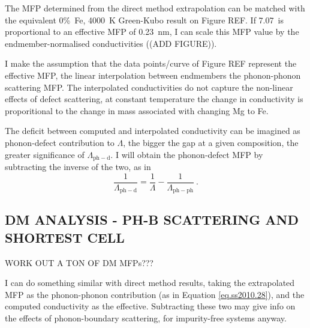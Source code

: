 The MFP determined from the direct method extrapolation can be matched with the equivalent 0\%~Fe, 4000~K Green-Kubo result on Figure REF. If 7.07~\wmks is proportional to an effective MFP of 0.23~nm, I can scale this MFP value by the \mgsios endmember-normalised conductivities ((ADD FIGURE)). 

I make the assumption that the data points/curve of Figure REF represent the effective MFP, the linear interpolation between endmembers the phonon-phonon scattering MFP. The interpolated conductivities do not capture the non-linear effects of defect scattering, at constant temperature the change in conductivity is proporitional to the change in mass associated with changing Mg to Fe.

The deficit between computed and interpolated conductivity can be imagined as phonon-defect contribution to $\Lambda$, the bigger the gap at a given composition, the greater significance of $\Lambda_{\mathrm{ph-d}}$. I will obtain the phonon-defect MFP by subtracting the inverse of the two, as in 
%
$$\frac{1}{\Lambda_{\mathrm{ph-d}}}=\frac{1}{\Lambda}-\frac{1}{\Lambda_{\mathrm{ph-ph}}}\ . $$





\subsection{DM ANALYSIS - PH-B SCATTERING AND SHORTEST CELL}

WORK OUT A TON OF DM MFPs???

I can do something similar with direct method results, taking the extrapolated MFP as the phonon-phonon contribution (as in Equation \ref{eq.ss2010.28}), and the computed conductivity as the effective. Subtracting these two may give info on the effects of phonon-boundary scattering, for impurity-free systems anyway.







\pagebreak
